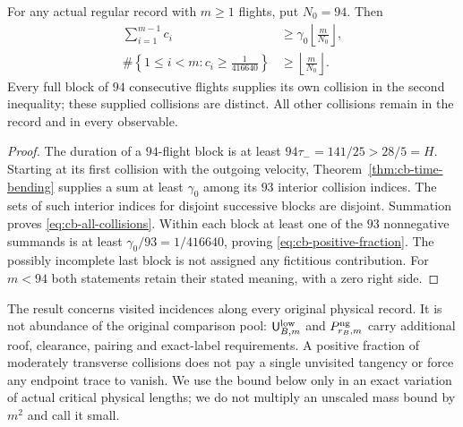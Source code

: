 \begin{corollary}
\label{cor:cb-collision-bending}
For any actual regular record with $m\geq1$ flights, put $N_0=94$.
Then
\begin{align}
 \sum_{i=1}^{m-1}c_i
   &\geq\gamma_0\left\lfloor\frac{m}{N_0}\right\rfloor,
       \label{eq:cb-all-collisions}\\
 \#\left\{1\leq i<m:c_i\geq\frac1{416640}\right\}
   &\geq\left\lfloor\frac{m}{N_0}\right\rfloor.
       \label{eq:cb-positive-fraction}
\end{align}
Every full block of $94$ consecutive flights supplies its own
collision in the second inequality; these supplied collisions are
distinct.  All other collisions remain in the record and in every
observable.
\end{corollary}
\begin{proof}
The duration of a $94$-flight block is at least
$94\tau_-=141/25>28/5=H$.  Starting at its first collision with the
outgoing velocity, Theorem~\ref{thm:cb-time-bending} supplies a sum
at least $\gamma_0$ among its $93$ interior collision indices.  The
sets of such interior indices for disjoint successive blocks are
disjoint.  Summation proves \eqref{eq:cb-all-collisions}.  Within each
block at least one of the $93$ nonnegative summands is at least
$\gamma_0/93=1/416640$, proving \eqref{eq:cb-positive-fraction}.
The possibly incomplete last block is not assigned any fictitious
contribution.  For $m<94$ both statements retain their stated
meaning, with a zero right side.
\end{proof}

\begin{remark}
\label{rem:cb-scope}
The result concerns visited incidences along every original physical
record.  It is not abundance of the original comparison pool:
$\mathsf U^{\rm low}_{B,m}$ and $P^{\rm ng}_{r_B,m}$ carry additional
roof, clearance, pairing and exact-label requirements.  A positive
fraction of moderately transverse collisions does not pay a single
unvisited tangency or force any endpoint trace to vanish.  We use the
bound below only in an exact variation of actual critical physical
lengths; we do not multiply an unscaled mass bound by $m^2$ and call
it small.
\end{remark}
